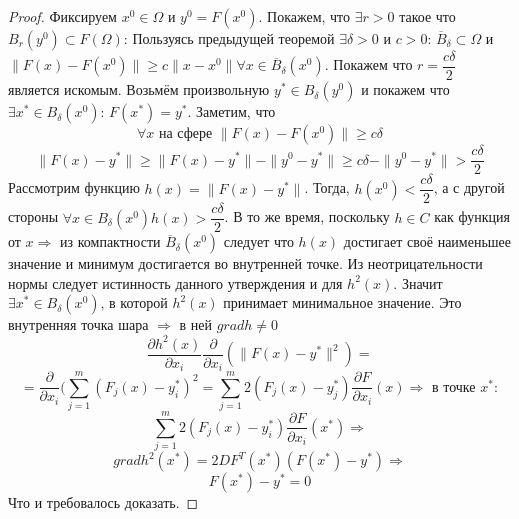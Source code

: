 \begin{proof}
    Фиксируем $x^0 \in \Omega$ и $y^0 = F(x^0)$. Покажем, что $\exists r > 0$ такое что $B_r(y^0) \subset F(\Omega)$: 
    Пользуясь предыдущей теоремой $\exists \delta > 0$ и $c > 0$: $\overline{B}_\delta \subset \Omega$ и $\|F(x) - F(x^0)\| \geq c \|x - x^0\| \forall x \in \overline{B}_\delta(x^0)$. Покажем что $r = \dfrac{c\delta}{2}$ является искомым. Возьмём произвольную $y^* \in B_\delta(y^0)$ и покажем что $\exists x^* \in B_\delta(x^0)$: $F(x^*) = y^*$. Заметим, что
    \[\forall x \text{ на сфере }\|F(x) - F(x^0)\| \geq c\delta \]
    \[\|F(x) - y^*\| \geq \|F(x) - y^*\| - \|y^0 - y^*\| \geq c\delta - \|y^0 - y^*\| > \dfrac{c\delta}{2}\]
    Рассмотрим функцию $h(x) = \|F(x) - y^*\|$. Тогда, $h(x^0) < \dfrac{c\delta}{2}$, а с другой стороны $\forall x \in B_\delta(x^0) h(x) > \dfrac{c\delta}{2}$. В то же время, поскольку $h \in C$ как функция от $x \Rightarrow$ из компактности $\overline{B}_\delta(x^0)$ следует что $h(x)$ достигает своё наименьшее значение и минимум достигается во внутренней точке. Из неотрицательности нормы следует истинность данного утверждения и для $h^2(x)$. Значит $\exists x^* \in B_\delta(x^0)$, в которой $h^2(x)$ принимает минимальное значение. Это внутренняя точка шара $\Rightarrow$ в ней $grad h \neq 0$
    \[\dfrac{\partial h^2(x)}{\partial x_i} \dfrac{\partial}{\partial x_i}(\|F(x) - y^*\|^2) = \]
    \[= \dfrac{\partial}{\partial x_i}(\sum\limits_{j = 1}^m(F_j(x) - y_i^*)^2 = \sum\limits_{j = 1}^m 2(F_j(x) - y^*_j) \dfrac{\partial F}{\partial x_i}(x) \Rightarrow \text{ в точке }x^*:\]
    \[\sum\limits_{j = 1}^m 2(F_j(x) - y_i^*)\dfrac{\partial F}{\partial x_i}(x^*) \Rightarrow\]
    \[grad h^2(x^*) = 2DF^T(x^*)(F(x^*) - y^*) \Rightarrow\]
    \[F(x^*) - y^* = 0\]
    Что и требовалось доказать.
\end{proof}
